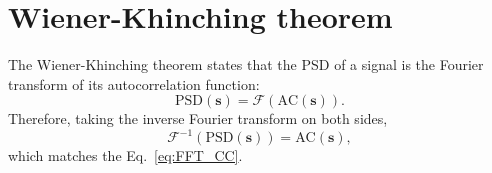 \section{Wiener-Khinching theorem}
\label{sec:WKT}

The Wiener-Khinching theorem states that the \gls{PSD} of a signal is
the Fourier transform of its autocorrelation function:
\begin{equation}
  \text{PSD}(\mathbf{s}) = \mathcal{F}(\text{AC}(\mathbf{s})).
\end{equation}
Therefore, taking the inverse Fourier transform on both sides,
\begin{equation}
  \mathcal{F}^{-1}(\text{PSD}(\mathbf{s})) = \text{AC}(\mathbf{s}),
\end{equation}
which matches the Eq.~\ref{eq:FFT_CC}.






